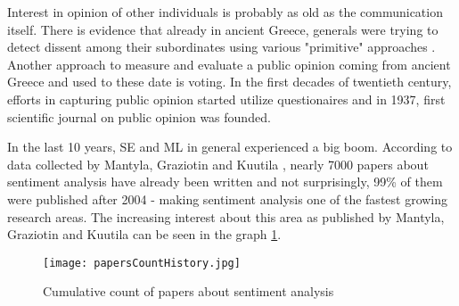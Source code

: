 Interest in opinion of other individuals is probably as old as the communication itself. There is evidence that already in ancient Greece, generals were trying to detect dissent among their subordinates using various "primitive" approaches \cite{richmond1998spies}. Another approach to measure and evaluate a public opinion coming from ancient Greece and used to these date is voting. In the first decades of twentieth century, efforts in capturing public opinion started utilize questionaires and in 1937, first scientific journal on public opinion was founded. 

In the last 10 years, SE and ML in general experienced a big boom. According to data collected by Mantyla, Graziotin and Kuutila \cite{mantyla2018evolution}, nearly 7000 papers about sentiment analysis have already been written and not surprisingly, 99\% of them were published after 2004 - making sentiment analysis one of the fastest growing research areas. The increasing interest about this area as published by Mantyla, Graziotin and Kuutila \cite{mantyla2018evolution} can be seen in the graph \ref{fig:papersCountHistory}.

\begin{figure}[H]%
    \centering
	\texttt{[image: papersCountHistory.jpg]}
    \caption{Cumulative count of papers about sentiment analysis}%
    \label{fig:papersCountHistory}%
\end{figure}


